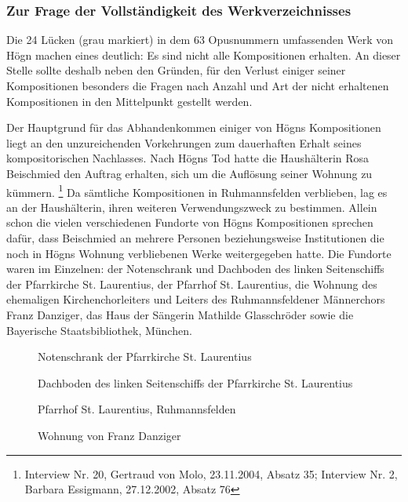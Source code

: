 \subsubsection{Zur Frage der Vollständigkeit des Werkverzeichnisses}

Die 24 Lücken (grau markiert) in dem 63 Opusnummern umfassenden Werk von
Högn machen eines deutlich: Es sind nicht alle Kompositionen erhalten.
An dieser Stelle sollte deshalb neben den Gründen, für den Verlust
einiger seiner Kompositionen besonders die Fragen nach Anzahl und Art
der nicht erhaltenen Kompositionen in den Mittelpunkt gestellt werden.

Der Hauptgrund für das Abhandenkommen einiger von Högns Kompositionen
liegt an den unzureichenden Vorkehrungen zum dauerhaften Erhalt seines
kompositorischen Nachlasses. Nach Högns Tod hatte die Haushälterin Rosa
Beischmied den Auftrag erhalten, sich um die Auflösung seiner Wohnung
zu kümmern. \footnote{Interview Nr. 20, Gertraud von Molo, 23.11.2004,
Absatz 35; Interview Nr. 2, Barbara Essigmann, 27.12.2002, Absatz 76}
Da sämtliche Kompositionen in Ruhmannsfelden verblieben, lag es an der
Haushälterin, ihren weiteren Verwendungszweck zu bestimmen. Allein
schon die vielen verschiedenen Fundorte von Högns Kompositionen
sprechen dafür, dass Beischmied an mehrere Personen beziehungsweise
Institutionen die noch in Högns Wohnung verbliebenen Werke
weitergegeben hatte. Die Fundorte waren im Einzelnen: der Notenschrank
und Dachboden des linken Seitenschiffs der Pfarrkirche St. Laurentius,
der Pfarrhof St. Laurentius, die Wohnung des ehemaligen
Kirchenchorleiters und Leiters des Ruhmannsfeldener Männerchors Franz
Danziger, das Haus der Sängerin Mathilde Glasschröder sowie die
Bayerische Staatsbibliothek, München.

\begin{figure}
\caption{Notenschrank der Pfarrkirche St. Laurentius}
\end{figure}

\begin{figure}
\caption{Dachboden des linken Seitenschiffs der Pfarrkirche St.
Laurentius}
\end{figure}

\begin{figure}
\caption{Pfarrhof St. Laurentius, Ruhmannsfelden}
\end{figure}

\begin{figure}
\caption{Wohnung von Franz Danziger}
\end{figure}

